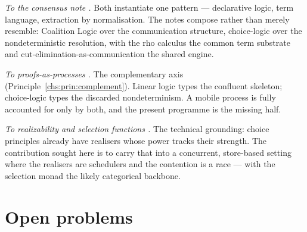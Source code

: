 \emph{To the consensus note \cite{consensus}.} Both instantiate one pattern --- declarative logic, term language,
extraction by normalisation. The notes compose rather than merely resemble: Coalition Logic over the communication
structure, choice-logic over the nondeterministic resolution, with the rho calculus the common term substrate and
cut-elimination-as-communication the shared engine.

\emph{To proofs-as-processes \cite{abramskyPaP,bellinscott,cairespfenning,wadler}.} The complementary axis
(Principle~\ref{chs:prin:complement}). Linear logic types the confluent skeleton; choice-logic types the discarded
nondeterminism. A mobile process is fully accounted for only by both, and the present programme is the missing half.

\emph{To realizability and selection functions \cite{martinlof,spector,bbc,krivine,escardo}.} The technical
grounding: choice principles already have realisers whose power tracks their strength. The contribution sought here
is to carry that into a concurrent, store-based setting where the realisers are schedulers and the contention is a
race --- with the selection monad \cite{escardo} the likely categorical backbone.

\section{Open problems}\label{chs:sec:open}

